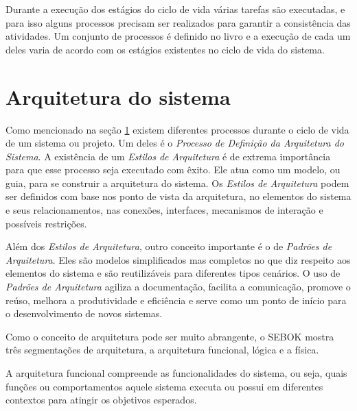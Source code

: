 	Durante a execução dos estágios do ciclo de vida várias tarefas são executadas, e para isso alguns processos precisam ser realizados para garantir a consistência das atividades. Um conjunto
	de processos é definido no livro e a execução de cada um deles varia de acordo com os estágios existentes no ciclo de vida do sistema.
	
\section{Arquitetura do sistema}\label{sec:revisao:arqSistema}

	Como mencionado na seção \ref{sec:revisao:arqSistema} existem diferentes processos durante o ciclo de vida de um sistema ou projeto. Um deles é o 
	\textit{Processo de Definição da Arquitetura do Sistema}. A existência de um  \textit{Estilos de Arquitetura} é de extrema importância para que esse processo seja executado com êxito. Ele
	atua como um modelo, ou guia, para se construir a arquitetura do sistema. Os \textit{Estilos de Arquitetura} podem ser definidos com base nos ponto de vista da arquitetura, no elementos do
	sistema e seus relacionamentos, nas conexões, interfaces, mecanismos de interação e possíveis restrições.
	
	Além dos \textit{Estilos de Arquitetura}, outro conceito importante é o de \textit{Padrões de Arquitetura}. Eles são modelos simplificados mas completos no que diz respeito aos elementos do
	sistema e são reutilizáveis para diferentes tipos cenários. O uso de \textit{Padrões de Arquitetura} agiliza  a documentação, facilita a comunicação, promove o reúso, melhora a produtividade
	e eficiência e serve como um ponto de início para o desenvolvimento de novos sistemas.

	Como o conceito de arquitetura pode ser muito abrangente, o SEBOK mostra três segmentações de arquitetura, a arquitetura funcional,
	lógica e a física.

	A arquitetura funcional compreende as funcionalidades do sistema, ou seja, quais funções ou comportamentos aquele sistema executa ou possui em diferentes contextos para atingir os objetivos
	esperados.